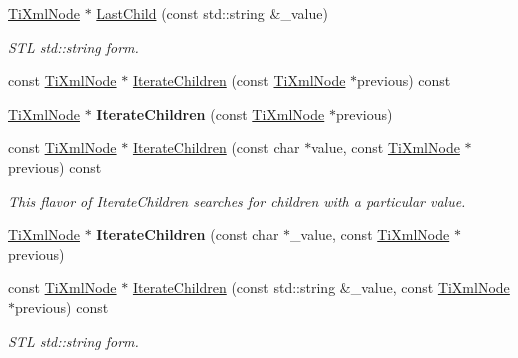 \begin{DoxyCompactItemize}
\hyperlink{class_ti_xml_node}{Ti\+Xml\+Node} $\ast$ \hyperlink{class_ti_xml_node_a69772c9202f70553f940b15c06b07be3}{Last\+Child} (const std\+::string \&\+\_\+value)
\begin{DoxyCompactList}\small\item\em S\+TL std\+::string form. \end{DoxyCompactList}\item 
const \hyperlink{class_ti_xml_node}{Ti\+Xml\+Node} $\ast$ \hyperlink{class_ti_xml_node_a67c3a02b797f08d9a31b2553661257e1}{Iterate\+Children} (const \hyperlink{class_ti_xml_node}{Ti\+Xml\+Node} $\ast$previous) const
\item 
\hypertarget{class_ti_xml_node_a2358e747118fdbf0e467b1e4f7d03de1}{}\label{class_ti_xml_node_a2358e747118fdbf0e467b1e4f7d03de1} 
\hyperlink{class_ti_xml_node}{Ti\+Xml\+Node} $\ast$ {\bfseries Iterate\+Children} (const \hyperlink{class_ti_xml_node}{Ti\+Xml\+Node} $\ast$previous)
\item 
\hypertarget{class_ti_xml_node_a74bc68a536c279a42af346cb1454f143}{}\label{class_ti_xml_node_a74bc68a536c279a42af346cb1454f143} 
const \hyperlink{class_ti_xml_node}{Ti\+Xml\+Node} $\ast$ \hyperlink{class_ti_xml_node_a74bc68a536c279a42af346cb1454f143}{Iterate\+Children} (const char $\ast$value, const \hyperlink{class_ti_xml_node}{Ti\+Xml\+Node} $\ast$previous) const
\begin{DoxyCompactList}\small\item\em This flavor of Iterate\+Children searches for children with a particular \textquotesingle{}value\textquotesingle{}. \end{DoxyCompactList}\item 
\hypertarget{class_ti_xml_node_a67ba8275e533e6f76340236c42ea0aea}{}\label{class_ti_xml_node_a67ba8275e533e6f76340236c42ea0aea} 
\hyperlink{class_ti_xml_node}{Ti\+Xml\+Node} $\ast$ {\bfseries Iterate\+Children} (const char $\ast$\+\_\+value, const \hyperlink{class_ti_xml_node}{Ti\+Xml\+Node} $\ast$previous)
\item 
\hypertarget{class_ti_xml_node_a412c25b2b7e6709a4b291b13df0632eb}{}\label{class_ti_xml_node_a412c25b2b7e6709a4b291b13df0632eb} 
const \hyperlink{class_ti_xml_node}{Ti\+Xml\+Node} $\ast$ \hyperlink{class_ti_xml_node_a412c25b2b7e6709a4b291b13df0632eb}{Iterate\+Children} (const std\+::string \&\+\_\+value, const \hyperlink{class_ti_xml_node}{Ti\+Xml\+Node} $\ast$previous) const
\begin{DoxyCompactList}\small\item\em S\+TL std\+::string form. \end{DoxyCompactList}\item 

\end{DoxyCompactItemize}
